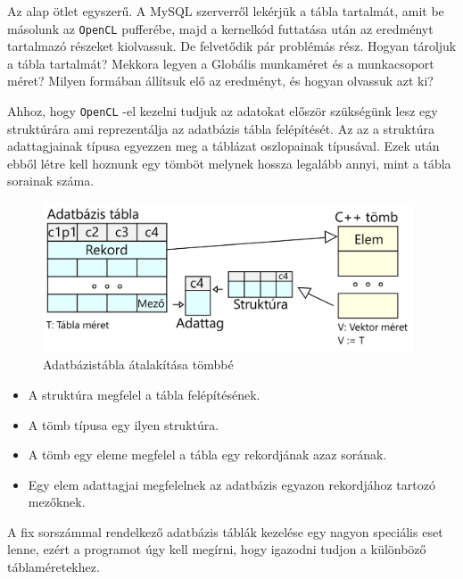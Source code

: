 
Az alap ötlet egyszerű. A MySQL szerverről lekérjük a tábla tartalmát, amit be másolunk az \texttt{OpenCL} pufferébe, majd a kernelkód futtatása után az eredményt tartalmazó részeket kiolvassuk. De felvetődik pár problémás rész. Hogyan tároljuk a tábla tartalmát? Mekkora legyen a Globális munkaméret és a munkacsoport méret? Milyen formában állítsuk elő az eredményt, és hogyan olvassuk azt ki?


Ahhoz, hogy \texttt{OpenCL} -el kezelni tudjuk az adatokat először szükségünk lesz egy struktúrára ami reprezentálja az adatbázis tábla felépítését. Az az a struktúra adattagjainak típusa egyezzen meg a táblázat oszlopainak típusával. Ezek után ebből létre kell hoznunk egy tömböt melynek hossza legalább annyi, mint a tábla sorainak száma.

\begin{figure}[h!]
\centering
\includegraphics[width=11cm]{images/data/structure.png}
\caption{Adatbázistábla átalakítása tömbbé}
\label{fig:opencl}
\end{figure}

\begin{itemize}
\item A struktúra megfelel a tábla felépítésének.
\item A tömb típusa egy ilyen struktúra.
\item A tömb egy eleme megfelel a tábla egy rekordjának azaz sorának.
\item Egy elem adattagjai megfelelnek az adatbázis egyazon rekordjához tartozó mezőknek.
\end{itemize}

\newpage
{}

A fix sorszámmal rendelkező adatbázis táblák kezelése egy nagyon speciális eset lenne, ezért a programot úgy kell megírni, hogy igazodni tudjon a különböző táblaméretekhez.

